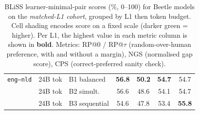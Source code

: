 \documentclass[11pt]{article}
\newcommand{\beetle}{Beetle} %
\begin{document}
\begin{table}[!ht]
\begin{minipage}[t]{0.49\linewidth}
\begin{tabular}{ll l cccc}
\midrule
\texttt{eng--nld} & 24B tok & B1 balanced & \cellcolor[rgb]{0.929,1.000,0.929} \textbf{56.8} & \cellcolor[rgb]{0.997,1.000,0.997} \textbf{50.2} & \cellcolor[rgb]{0.938,1.000,0.938} \textbf{54.7} & \cellcolor[rgb]{0.904,1.000,0.904} 54.7 \\
 & 24B tok & B2 simult. & \cellcolor[rgb]{0.931,1.000,0.931} 56.6 & \cellcolor[rgb]{1.000,0.987,0.987} 48.6 & \cellcolor[rgb]{0.946,1.000,0.946} 54.1 & \cellcolor[rgb]{0.904,1.000,0.904} 54.7 \\
 & 24B tok & B3 sequential & \cellcolor[rgb]{0.952,1.000,0.952} 54.6 & \cellcolor[rgb]{1.000,0.979,0.979} 47.8 & \cellcolor[rgb]{0.955,1.000,0.955} 53.4 & \cellcolor[rgb]{0.881,1.000,0.881} \textbf{55.8} \\
\bottomrule
\end{tabular}
\end{minipage}
\caption{BLiSS learner-minimal-pair scores (\%, 0--100) for \beetle{} models on the \emph{matched-L1 cohort}, grouped by L1 then token budget. Cell shading encodes score on a fixed scale (darker green = higher). Per L1, the highest value in each metric column is shown in \textbf{bold}. Metrics: RP@0 / RP@$\tau$ (random-over-human preference, with and without a margin), NGS (normalised gap score), CPS (correct-preferred sanity check).}
\label{tab:bliss_beetle}
\end{table}
\end{document}
